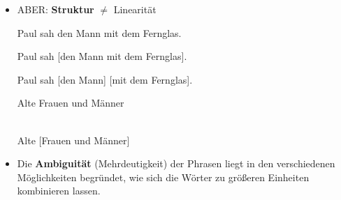 \begin{frame}

\begin{itemize}
	\item ABER: \textbf{Struktur} $\neq$ Linearität
	
	\ea Paul sah den Mann mit dem Fernglas.

\pause 
	
		\ea Paul sah [den Mann mit dem Fernglas].\\ 
		\vs 
		
		\ex Paul sah [den 	Mann] [mit dem 	Fernglas].
		\z
	\z 

\pause 
	
	\ea Alte Frauen und Männer

\pause 
	
		\\
		\vs
		\ex Alte [Frauen und Männer]
		\z
	\z 

\pause 

	\item Die \textbf{Ambiguität} (Mehrdeutigkeit) der Phrasen liegt in den verschiedenen Möglichkeiten begründet, wie sich die Wörter zu größeren Einheiten kombinieren lassen.

\end{itemize}

\end{frame}


